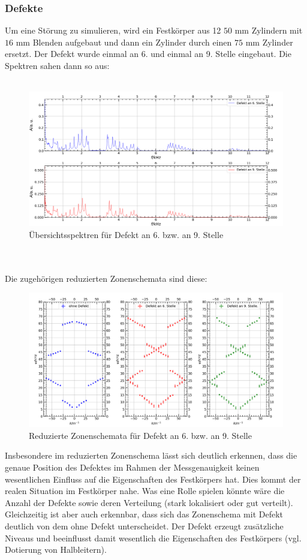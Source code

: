 \documentclass[german,  %
parskip=full,  %
]{scrartcl}
\begin{document}
\subsubsection{Defekte}
Um eine Störung zu simulieren, wird ein Festkörper aus 12 $50$ mm Zylindern mit $16$ mm Blenden aufgebaut und dann ein Zylinder durch einen $75$ mm Zylinder ersetzt. Der Defekt wurde einmal an 6. und einmal an 9. Stelle eingebaut. Die Spektren sahen dann so aus:
\\\\
\begin{figure}[h!]
\centering
\includegraphics[width=\textwidth]{4641_und_4642_Uebersichtssprektren.png}
\caption{Übersichtsspektren für Defekt an 6. bzw. an 9. Stelle}
\end{figure}
\\\\
Die zugehörigen reduzierten Zonenschemata sind diese:
\newpage
\begin{figure}[h!]
\centering
\includegraphics[width=\textwidth]{4641_und_4642_reduziertes_Zonenschema.png}
\caption{Reduzierte Zonenschemata für Defekt an 6. bzw. an 9. Stelle}
\end{figure}
Insbesondere im reduzierten Zonenschema lässt sich deutlich erkennen, dass die genaue Position des Defektes im Rahmen der Messgenauigkeit keinen wesentlichen Einfluss auf die Eigenschaften des Festkörpers hat. Dies kommt der realen Situation im Festkörper nahe. Was eine Rolle spielen könnte wäre die Anzahl der Defekte sowie deren Verteilung (stark lokalisiert oder gut verteilt). Gleichzeitig ist aber auch erkennbar, dass sich das Zonenschema mit Defekt deutlich von dem ohne Defekt unterscheidet. Der Defekt erzeugt zusätzliche Niveaus und beeinflusst damit wesentlich die Eigenschaften des Festkörpers (vgl. Dotierung von Halbleitern).
\end{document}
